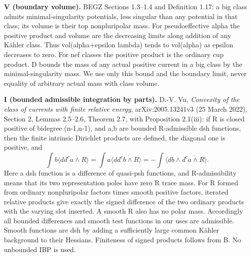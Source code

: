 \documentclass[
]{article}
\begin{document}
\textbf{V (boundary volume).} BEGZ Sections 1.3--1.4 and Definition
1.17: a big class admits minimal-singularity potentials, less singular
than any potential in that class; its volume is their top nonpluripolar
mass. For pseudoeffective alpha the positive product and volume are the
decreasing limits along addition of any Kähler class. Thus
vol(alpha+epsilon lambda) tends to vol(alpha) as epsilon decreases to
zero. For nef classes the positive product is the ordinary cup product.
D bounds the mass of any actual positive current in a big class by the
minimal-singularity mass. We use only this bound and the boundary limit,
never equality of arbitrary actual mass with class volume.

\textbf{I (bounded admissible integration by parts).} D.-V. Vu,
\emph{Convexity of the class of currents with finite relative energy},
arXiv:2005.13241v3 (25 March 2022), Section 2, Lemmas 2.5--2.6, Theorem
2.7, with Proposition 2.1(iii): if R is closed positive of bidegree
(n-1,n-1), and a,b are bounded R-admissible dsh functions, then the
finite intrinsic Dirichlet products are defined, the diagonal one is
positive, and \[
\int b\langle dd^ca\mathbin{\dot\wedge}R\rangle
=\int a\langle dd^cb\mathbin{\dot\wedge}R\rangle
=-\int\langle db\wedge d^ca\mathbin{\dot\wedge}R\rangle.\tag{I}
\] Here a dsh function is a difference of quasi-psh functions, and
R-admissibility means that its two representation poles have zero R
trace mass. For R formed from ordinary nonpluripolar factors times
smooth positive factors, iterated relative products give exactly the
signed difference of the two ordinary products with the varying slot
inserted. A smooth R also has no polar mass. Accordingly all bounded
differences and smooth test functions in our uses are admissible. Smooth
functions are dsh by adding a sufficiently large common Kähler
background to their Hessians. Finiteness of signed products follows from
B. No unbounded IBP is used.
\end{document}
